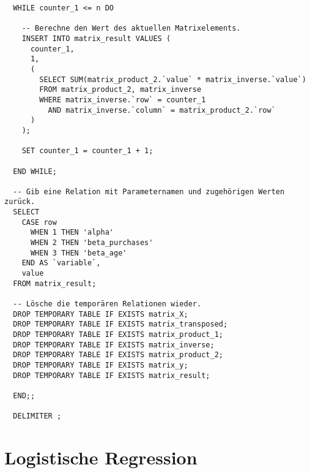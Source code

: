\begin{verbatim}
  WHILE counter_1 <= n DO

    -- Berechne den Wert des aktuellen Matrixelements.
    INSERT INTO matrix_result VALUES (
      counter_1,
      1,
      (
        SELECT SUM(matrix_product_2.`value` * matrix_inverse.`value`)
        FROM matrix_product_2, matrix_inverse
        WHERE matrix_inverse.`row` = counter_1
          AND matrix_inverse.`column` = matrix_product_2.`row`
      )
    );

    SET counter_1 = counter_1 + 1;

  END WHILE;

  -- Gib eine Relation mit Parameternamen und zugehörigen Werten zurück.
  SELECT
    CASE row
      WHEN 1 THEN 'alpha'
      WHEN 2 THEN 'beta_purchases'
      WHEN 3 THEN 'beta_age'
    END AS `variable`,
    value
  FROM matrix_result;

  -- Lösche die temporären Relationen wieder.
  DROP TEMPORARY TABLE IF EXISTS matrix_X;
  DROP TEMPORARY TABLE IF EXISTS matrix_transposed;
  DROP TEMPORARY TABLE IF EXISTS matrix_product_1;
  DROP TEMPORARY TABLE IF EXISTS matrix_inverse;
  DROP TEMPORARY TABLE IF EXISTS matrix_product_2;
  DROP TEMPORARY TABLE IF EXISTS matrix_y;
  DROP TEMPORARY TABLE IF EXISTS matrix_result;

  END;;

  DELIMITER ;
\end{verbatim}

\section{Logistische Regression}
\label{appendix:D:3}

